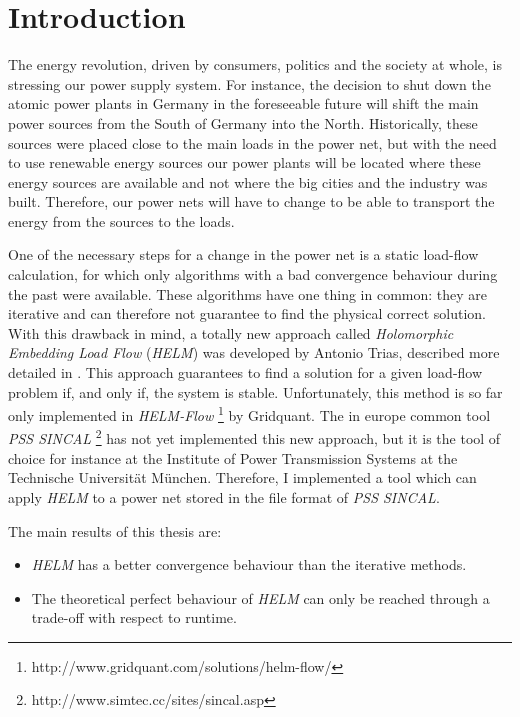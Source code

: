 \chapter{Introduction}
The energy revolution, driven by consumers, politics and the society at whole, is stressing our power supply system. For instance, the decision to shut down the atomic power plants in Germany in the foreseeable future will shift the main power sources from the South of Germany into the North. Historically, these sources were placed close to the main loads in the power net, but with the need to use renewable energy sources our power plants will be located where these energy sources are available and not where the big cities and the industry was built. Therefore, our power nets will have to change to be able to transport the energy from the sources to the loads.

One of the necessary steps for a change in the power net is a static load-flow calculation, for which only algorithms with a bad convergence behaviour during the past were available. These algorithms have one thing in common: they are iterative and can therefore not guarantee to find the physical correct solution. With this drawback in mind, a totally new approach called \emph{Holomorphic Embedding Load Flow} (\emph{HELM})  \citep{helmIEEE} was developed by Antonio Trias, described more detailed in . This approach guarantees to find a solution for a given load-flow problem if, and only if, the system is stable. Unfortunately, this method is so far only implemented in \emph{HELM-Flow} \footnote{http://www.gridquant.com/solutions/helm-flow/} by Gridquant. The in europe common tool \emph{PSS SINCAL} \footnote{http://www.simtec.cc/sites/sincal.asp} has not yet implemented this new approach, but it is the tool of choice for instance at the Institute of Power Transmission Systems at the Technische Universität München. Therefore, I implemented a tool which can apply \emph{HELM} to a power net stored in the file format of \emph{PSS SINCAL}.

The main results of this thesis are:
\begin{itemize}
	\item \emph{HELM} has a better convergence behaviour than the iterative methods.
	\item The theoretical perfect behaviour of \emph{HELM} can only be reached through a trade-off with respect to runtime.
\end{itemize}